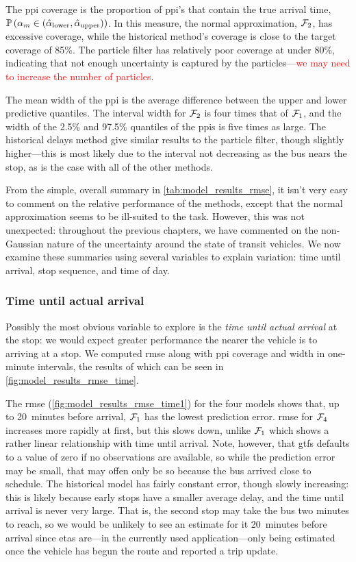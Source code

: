 The \gls{ppi} coverage is the proportion of \gls{ppi}'s that contain the true arrival time, $\mathbb{P}\left(\alpha_m \in (\hat\alpha_{\text{lower}},\hat\alpha_{\text{upper}})\right)$. In this measure, the normal approximation, $\mathcal{F}_2$, has excessive coverage, while the historical method's coverage is close to the target coverage of 85\%. The particle filter has relatively poor coverage at under 80\%, indicating that not enough uncertainty is captured by the particles---\textcolor{red}{we may need to increase the number of particles}.

The mean width of the \gls{ppi} is the average difference between the upper and lower predictive quantiles. The interval width for $\mathcal{F}_2$ is four times that of $\mathcal{F}_1$, and the width of the 2.5\% and 97.5\% quantiles of the \glspl{ppi} is five times as large. The historical delays method give similar results to the particle filter, though slightly higher---this is most likely due to the interval not decreasing as the bus nears the stop, as is the case with all of the other methods.

From the simple, overall summary in \cref{tab:model_results_rmse}, it isn't very easy to comment on the relative performance of the methods, except that the normal approximation seems to be ill-suited to the task. However, this was not unexpected: throughout the previous chapters, we have commented on the non-Gaussian nature of the uncertainty around the state of transit vehicles. We now examine these summaries using several variables to explain variation: time until arrival, stop sequence, and time of day.


\subsubsection{Time until actual arrival}

Possibly the most obvious variable to explore is the \emph{time until actual arrival} at the stop: we would expect greater performance the nearer the vehicle is to arriving at a stop. We computed \gls{rmse} along with \gls{ppi} coverage and width in one-minute intervals, the results of which can be seen in \cref{fig:model_results_rmse_time}.


The \gls{rmse} (\cref{fig:model_results_rmse_time1}) for the four models shows that, up to 20~minutes before arrival, $\mathcal{F}_1$ has the lowest prediction error. \Gls{rmse} for $\mathcal{F}_4$ increases more rapidly at first, but this slows down, unlike $\mathcal{F}_1$ which shows a rather linear relationship with time until arrival.  Note, however, that \gls{gtfs} defaults to a value of zero if no observations are available, so while the prediction error may be small, that may offen only be so because the bus arrived close to schedule. The historical model has fairly constant error, though slowly increasing: this is likely because early stops have a smaller average delay, and the time until arrival is never very large. That is, the second stop may take the bus two minutes to reach, so we would be unlikely to see an estimate for it 20~minutes before arrival since \glspl{eta} are---in the currently used application---only being estimated once the vehicle has begun the route and reported a trip update.


